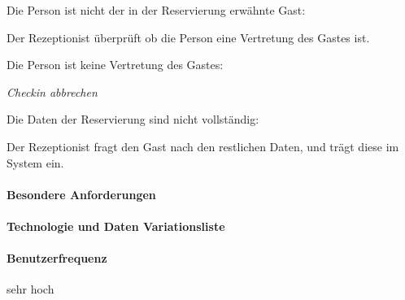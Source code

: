 \begin{longenum}
	\begin{longenum}
		\item Die Person ist nicht der in der \Gls{Reservierung} erwähnte Gast:
		\begin{longenum}
			\item Der \Gls{Rezeptionist} überprüft ob die Person eine Vertretung des \Gls{Gast}es ist.
			\begin{longenum}
				\item Die Person ist keine Vertretung des \Gls{Gast}es:
				\begin{longenum}
					\item \emph{\Gls{Checkin} abbrechen}
				\end{longenum}
			\end{longenum}
		\end{longenum}
	\end{longenum}
	\item
	\begin{longenum}
		\item Die Daten der \Gls{Reservierung} sind nicht vollständig:
		\begin{longenum}
			\item Der \Gls{Rezeptionist} fragt den \Gls{Gast} nach den restlichen Daten, und trägt diese im System ein.
		\end{longenum}
	\end{longenum}
	\item
	\item
\end{longenum}

\paragraph{Besondere Anforderungen}

\paragraph{Technologie und Daten Variationsliste}

\paragraph{Benutzerfrequenz}
sehr hoch

